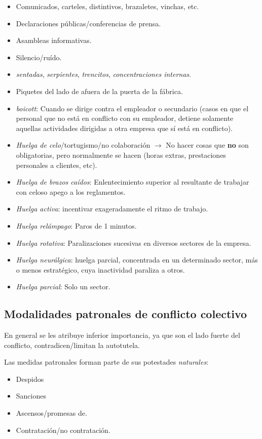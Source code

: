 \documentclass[spanish,12pt,a4paper,titlepage]{report}
\begin{document}
\begin{itemize}
\item Comunicados, carteles, distintivos, brazaletes, vinchas, etc.
\item Declaraciones públicas/conferencias de prensa.
\item Asambleas informativas.
\item Silencio/ruído.
\item \textit{sentadas}, \textit{serpientes}, \textit{trencitos}, \textit{concentraciones internas}.
\item Piquetes del lado de afuera de la puerta de la fábrica.
\item \textit{boicott}: Cuando se dirige contra el empleador o secundario (casos en que el personal que no está en conflicto con su empleador, detiene solamente aquellas actividades dirigidas a otra empresa que sí está en conflicto).
\item \textit{Huelga de celo}/tortugismo/no colaboración $\rightarrow$ No hacer cosas que \textbf{no} son obligatorias, pero normalmente se hacen (horas extras, prestaciones personales a clientes, etc).
\item \textit{Huelga de brazos caídos}: Enlentecimiento superior al resultante de trabajar con celoso apego a los reglamentos.
\item \textit{Huelga activa}: incentivar exageradamente el ritmo de trabajo.
\item \textit{Huelga relámpago}:  Paros de 1 minutos.
\item \textit{Huelga rotativa}: Paralizaciones sucesivas en diversos sectores de la empresa.
\item \textit{Huelga neurálgica}: huelga parcial, concentrada en un determinado sector, más o menos estratégico, cuya inactividad paraliza a otros.
\item \textit{Huelga parcial}: Solo un sector.
\end{itemize}

\subsection{Modalidades patronales de conflicto colectivo}
\label{sec:Modalidades-patronales-de-conflicto-colectivo}

En general se les atribuye inferior importancia, ya que son el lado fuerte del conflicto, contradicen/limitan la autotutela.

Las medidas patronales forman parte de sus potestades \textit{naturales}:
\begin{itemize}
\item Despidos
\item Sanciones
\item Ascensos/promesas de.
\item Contratación/no contratación.
\end{itemize}
\end{document}
